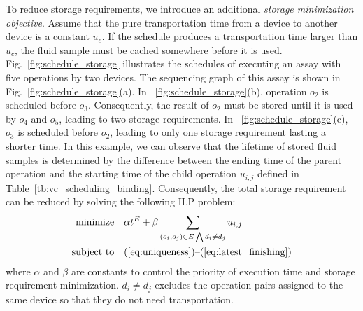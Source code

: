 

To reduce storage requirements, we introduce an additional \textit{storage minimization
objective}.
Assume that the pure transportation time from a device to another device
is a constant $u_c$.
If the schedule produces a transportation time larger
than $u_c$, the fluid sample must be cached somewhere before it is
used.
Fig.~\ref{fig:schedule_storage} illustrates
the schedules of executing an assay with five operations by two devices. The sequencing graph of this assay is shown in Fig.~\ref{fig:schedule_storage}(a).
In \figname~\ref{fig:schedule_storage}(b),
operation $o_2$ is scheduled before $o_3$. Consequently, the result of $o_2$
must be stored until it is used by $o_4$ and $o_5$, leading to two storage
requirements. %
In \figname~\ref{fig:schedule_storage}(c), $o_3$ is scheduled before $o_2$,
leading to only one storage requirement lasting a shorter time.
In this example, we can observe that
the lifetime of stored fluid samples is determined by the difference between
the ending time of the parent operation and the starting time of the child
operation $u_{i,j}$ defined in Table~\ref{tb:vc_scheduling_binding}. Consequently, the total storage requirement can be reduced by
solving the following ILP problem:
\begin{align}
\text{minimize} & \quad \alpha t^E+\beta\sum_{{(o_i,o_j)\in E\bigwedge d_i\ne d_j }}u_{i,j}
 \label{eq:minobj}\\
\text{subject to} & \quad
\text{(\ref{eq:uniqueness})--(\ref{eq:latest_finishing}})\label{eq:op_cond}
\end{align}
where $\alpha$ and $\beta$ are constants to control the priority of
execution time and storage requirement minimization.
$d_i \ne d_j $ excludes the operation pairs assigned to the same device
so that they do not need transportation.

